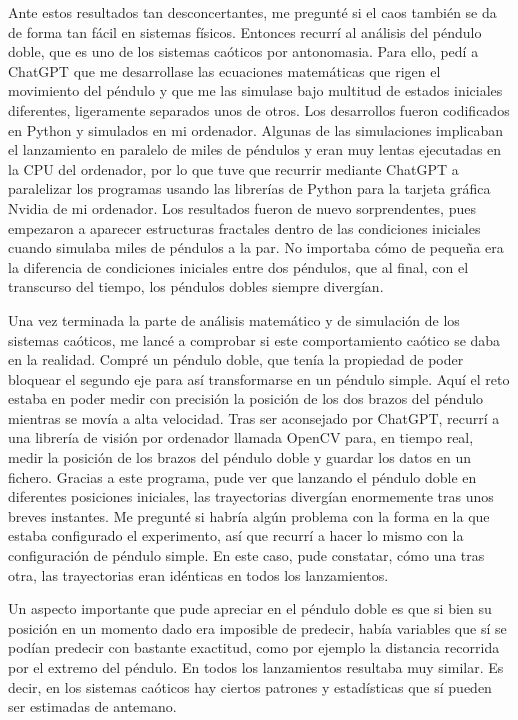 \documentclass[
  10pt,
  a4paper,
  DIV=11,
  numbers=noendperiod,
  open=any]{scrreprt}
\numberwithin{equation}{chapter}
\numberwithin{equation}{section}
\renewcommand{\[}{\begin{equation}}
\renewcommand{\]}{\end{equation}}
\begin{document}
Ante estos resultados tan desconcertantes, me pregunté si el caos
también se da de forma tan fácil en sistemas físicos. Entonces recurrí
al análisis del péndulo doble, que es uno de los sistemas caóticos por
antonomasia. Para ello, pedí a ChatGPT que me desarrollase las
ecuaciones matemáticas que rigen el movimiento del péndulo y que me las
simulase bajo multitud de estados iniciales diferentes, ligeramente
separados unos de otros. Los desarrollos fueron codificados en Python y
simulados en mi ordenador. Algunas de las simulaciones implicaban el
lanzamiento en paralelo de miles de péndulos y eran muy lentas
ejecutadas en la CPU del ordenador, por lo que tuve que recurrir
mediante ChatGPT a paralelizar los programas usando las librerías de
Python para la tarjeta gráfica Nvidia de mi ordenador. Los resultados
fueron de nuevo sorprendentes, pues empezaron a aparecer estructuras
fractales dentro de las condiciones iniciales cuando simulaba miles de
péndulos a la par. No importaba cómo de pequeña era la diferencia de
condiciones iniciales entre dos péndulos, que al final, con el
transcurso del tiempo, los péndulos dobles siempre divergían.

Una vez terminada la parte de análisis matemático y de simulación de los
sistemas caóticos, me lancé a comprobar si este comportamiento caótico
se daba en la realidad. Compré un péndulo doble, que tenía la propiedad
de poder bloquear el segundo eje para así transformarse en un péndulo
simple. Aquí el reto estaba en poder medir con precisión la posición de
los dos brazos del péndulo mientras se movía a alta velocidad. Tras ser
aconsejado por ChatGPT, recurrí a una librería de visión por ordenador
llamada OpenCV para, en tiempo real, medir la posición de los brazos del
péndulo doble y guardar los datos en un fichero. Gracias a este
programa, pude ver que lanzando el péndulo doble en diferentes
posiciones iniciales, las trayectorias divergían enormemente tras unos
breves instantes. Me pregunté si habría algún problema con la forma en
la que estaba configurado el experimento, así que recurrí a hacer lo
mismo con la configuración de péndulo simple. En este caso, pude
constatar, cómo una tras otra, las trayectorias eran idénticas en todos
los lanzamientos.

Un aspecto importante que pude apreciar en el péndulo doble es que si
bien su posición en un momento dado era imposible de predecir, había
variables que sí se podían predecir con bastante exactitud, como por
ejemplo la distancia recorrida por el extremo del péndulo. En todos los
lanzamientos resultaba muy similar. Es decir, en los sistemas caóticos
hay ciertos patrones y estadísticas que sí pueden ser estimadas de
antemano.
\end{document}
